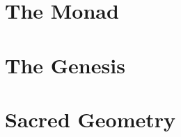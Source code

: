 \documentclass[12pt,a4paper]{book}
\begin{document}
\tableofcontents

\part{The Monad}

% 

\part{The Genesis}



% 

% 

% 

% 

% 



% 

% 

% 

\part{Sacred Geometry}

% 

% 

% 

% 

% 
\end{document}
